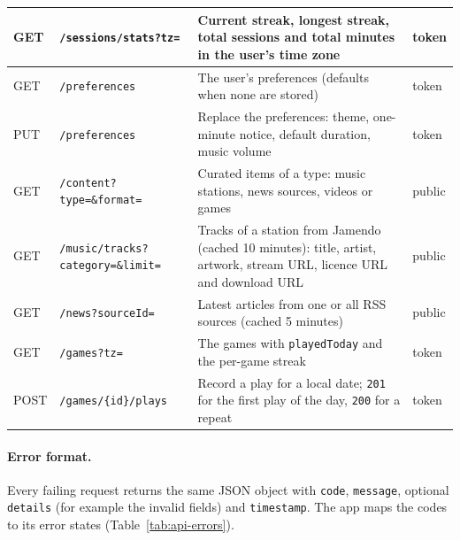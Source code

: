 \begin{longtable}{|>{\raggedright\arraybackslash}p{1.2cm}|>{\raggedright\arraybackslash}p{4.4cm}|>{\raggedright\arraybackslash}p{6.4cm}|>{\raggedright\arraybackslash}p{2.0cm}|}
GET & \texttt{/sessions/stats?tz=} & Current streak, longest streak, total sessions and total minutes in the user's time zone & token \\ \hline
GET & \texttt{/preferences} & The user's preferences (defaults when none are stored) & token \\ \hline
PUT & \texttt{/preferences} & Replace the preferences: theme, one-minute notice, default duration, music volume & token \\ \hline
GET & \texttt{/content?type=\&format=} & Curated items of a type: music stations, news sources, videos or games & public \\ \hline
GET & \texttt{/music/tracks?category=\&limit=} & Tracks of a station from Jamendo (cached 10 minutes): title, artist, artwork, stream URL, licence URL and download URL & public \\ \hline
GET & \texttt{/news?sourceId=} & Latest articles from one or all RSS sources (cached 5 minutes) & public \\ \hline
GET & \texttt{/games?tz=} & The games with \texttt{playedToday} and the per-game streak & token \\ \hline
POST & \texttt{/games/\{id\}/plays} & Record a play for a local date; \texttt{201} for the first play of the day, \texttt{200} for a repeat & token \\ \hline
\end{longtable}
\endgroup

\paragraph{Error format.}
Every failing request returns the same JSON object with \texttt{code},
\texttt{message}, optional \texttt{details} (for example the invalid fields)
and \texttt{timestamp}. The app maps the codes to its error states
(Table~\ref{tab:api-errors}).


